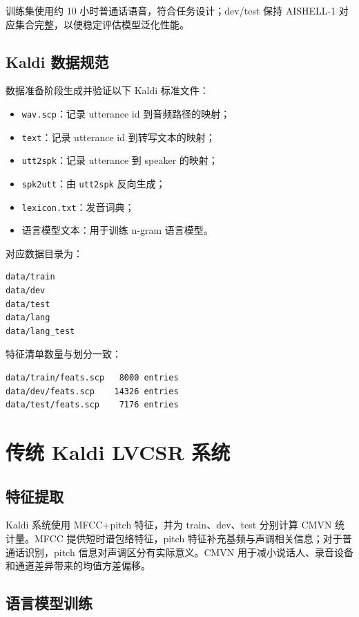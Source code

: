 \documentclass[UTF8,a4paper,12pt]{ctexart}
\begin{document}
训练集使用约 10 小时普通话语音，符合任务设计；dev/test 保持 AISHELL-1 对应集合完整，以便稳定评估模型泛化性能。

\subsection{Kaldi 数据规范}

数据准备阶段生成并验证以下 Kaldi 标准文件：

\begin{itemize}
  \item \texttt{wav.scp}：记录 utterance id 到音频路径的映射；
  \item \texttt{text}：记录 utterance id 到转写文本的映射；
  \item \texttt{utt2spk}：记录 utterance 到 speaker 的映射；
  \item \texttt{spk2utt}：由 \texttt{utt2spk} 反向生成；
  \item \texttt{lexicon.txt}：发音词典；
  \item 语言模型文本：用于训练 n-gram 语言模型。
\end{itemize}

对应数据目录为：

\begin{lstlisting}
data/train
data/dev
data/test
data/lang
data/lang_test
\end{lstlisting}

特征清单数量与划分一致：

\begin{lstlisting}
data/train/feats.scp   8000 entries
data/dev/feats.scp    14326 entries
data/test/feats.scp    7176 entries
\end{lstlisting}

\section{传统 Kaldi LVCSR 系统}

\subsection{特征提取}

Kaldi 系统使用 MFCC+pitch 特征，并为 train、dev、test 分别计算 CMVN 统计量。MFCC 提供短时谱包络特征，pitch 特征补充基频与声调相关信息；对于普通话识别，pitch 信息对声调区分有实际意义。CMVN 用于减小说话人、录音设备和通道差异带来的均值方差偏移。

\subsection{语言模型训练}
\end{document}
